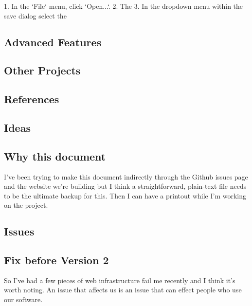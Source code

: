 \documentclass[a4paper]{report}
\begin{document}
1. In the `File` menu, click `Open...`.
2.  The
3.  In the dropdown menu within the save dialog select the

\subsection{Advanced Features}

\subsection{Other Projects}

\subsection{References}

\subsection{Ideas}

\subsection{Why this document}

I've been trying to make this document indirectly through the Github
issues page and the website we're building but I think a
straightforward, plain-text file needs to be the ultimate backup for
this. Then I can have a printout while I'm working on the project.

\subsection{Issues}

\subsection{Fix before Version 2}

So I've had a few pieces of web infrastructure fail me recently and I
think it's worth noting. An issue that affects us is an issue that can
effect people who use our software.
\end{document}
